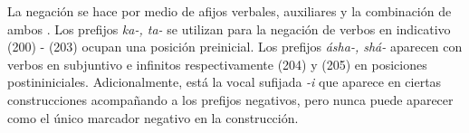 La negación se hace por medio de afijos verbales, auxiliares y la combinación de ambos \textcolor{MidnightBlue}{\citep{fwe}}. Los prefijos {\setmainfont{Charis SIL} \textit{ka-, ta-}} se utilizan para la negación de verbos en indicativo (200) - (203) ocupan una posición preinicial. Los prefijos {\setmainfont{Charis SIL} \textit{ásha-, shá-}} aparecen con verbos en subjuntivo e infinitos respectivamente (204) y (205) en posiciones postininiciales. Adicionalmente, está la vocal sufijada {\setmainfont{Charis SIL} \textit{-i}} que aparece en ciertas construcciones acompañando a los prefijos negativos, pero nunca puede aparecer como el único marcador negativo en la construcción. 